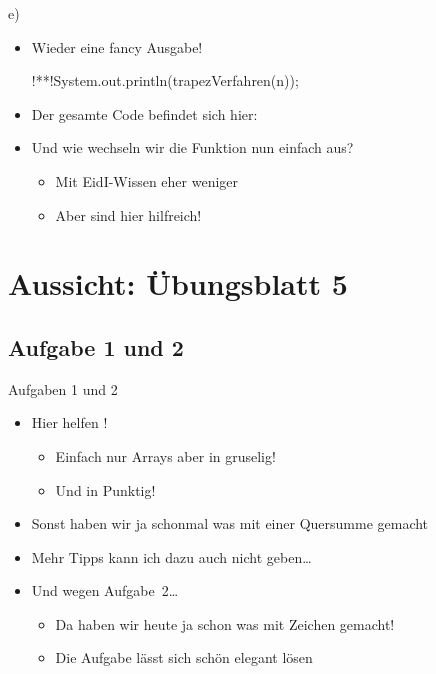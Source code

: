 \begin{frame}[fragile]{e)~}
\begin{itemize}[<+(1)->]
    \itemsep10pt
    \item Wieder eine fancy Ausgabe!
\begin{plainjava}[aboveskip=0pt]
!**!System.out.println(trapezVerfahren(n));
\end{plainjava}
    \item<4-> Der gesamte Code befindet sich hier:~
    \iffull
    \item<5-> Und wie wechseln wir die Funktion nun einfach aus? \begin{itemize}
        \item<6-> Mit EidI-Wissen eher weniger
        \item<7-> Aber  sind hier hilfreich!
    \end{itemize}
    \fi
\end{itemize}
\end{frame}

\iffull
{}
\section{Aussicht: Übungsblatt 5}
\subsection{Aufgabe 1 und 2}
\begin{frame}{Aufgaben 1 und 2}
\begin{itemize}[<+(1)->]
    \itemsep9pt
    \item Hier helfen ! \begin{itemize}
        \item Einfach nur Arrays aber in gruselig!
        \item Und in Punktig! 
    \end{itemize}
    \item Sonst haben wir ja schonmal was mit einer Quersumme gemacht 
    \item Mehr Tipps kann ich dazu auch nicht geben\ldots
    \item Und wegen Aufgabe~2\ldots \begin{itemize}
        \item Da haben wir heute ja schon was mit Zeichen gemacht!
        \item Die Aufgabe lässt sich schön elegant lösen
    \end{itemize}
\end{itemize}
\end{frame}

